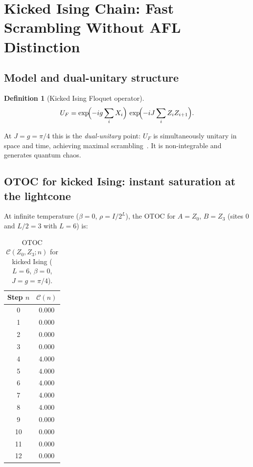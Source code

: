 \documentclass[12pt,a4paper]{article}
\newtheorem{definition}[theorem]{Definition}
\begin{document}
\section{Kicked Ising Chain: Fast Scrambling Without AFL Distinction}
\label{sec:ki}

\subsection{Model and dual-unitary structure}

\begin{definition}[Kicked Ising Floquet operator]
  \[
    U_F = \exp\!\Bigl(-ig\sum_i X_i\Bigr)\,\exp\!\Bigl(-iJ\sum_i Z_i Z_{i+1}\Bigr).
  \]
\end{definition}

At $J = g = \pi/4$ this is the \emph{dual-unitary} point: $U_F$ is simultaneously
unitary in space and time, achieving maximal scrambling~\cite{bertini2019}.  It is
non-integrable and generates quantum chaos.

\subsection{OTOC for kicked Ising: instant saturation at the lightcone}

At infinite temperature ($\beta = 0$, $\rho = I/2^L$), the OTOC for
$A = Z_0$, $B = Z_3$ (sites 0 and $L/2 = 3$ with $L = 6$) is:

\begin{table}[h]
\centering
\caption{OTOC $\mathcal{C}(Z_0, Z_3; n)$ for kicked Ising ($L = 6$, $\beta = 0$,
$J = g = \pi/4$).}
\label{tab:otoc_ki}
\begin{tabular}{cc}
\hline
Step $n$ & $\mathcal{C}(n)$ \\
\hline
0 & 0.000 \\
1 & 0.000 \\
2 & 0.000 \\
3 & 0.000 \\
4 & 4.000 \\
5 & 4.000 \\
6 & 4.000 \\
7 & 4.000 \\
8 & 4.000 \\
9 & 0.000 \\
10 & 0.000 \\
11 & 0.000 \\
12 & 0.000 \\
\hline
\end{tabular}
\end{table}
\end{document}
